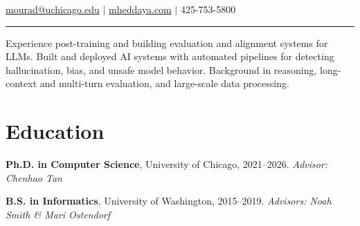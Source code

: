 \documentclass[11pt,letterpaper]{article}
\begin{document}
\hfill{\normalsize \href{mailto:mourad@uchicago.edu}{mourad@uchicago.edu} $|$ \href{https://mheddaya.com}{mheddaya.com} $|$ 425-753-5800}
\vspace{2pt}
\hrule

\vspace{12pt}
\noindent 
Experience post-training and building evaluation and alignment systems for LLMs.
Built and deployed AI systems with automated pipelines for detecting hallucination, bias, and unsafe model behavior.
Background in reasoning, long-context and multi-turn evaluation, and large-scale data processing.

\section*{Education}

\noindent\textbf{Ph.D. in Computer Science}, University of Chicago, 2021--2026. \textit{Advisor: Chenhao Tan}

\vspace{4pt}

\noindent\textbf{B.S. in Informatics}, University of Washington, 2015--2019. \textit{Advisors: Noah Smith \& Mari Ostendorf}

\end{document}

